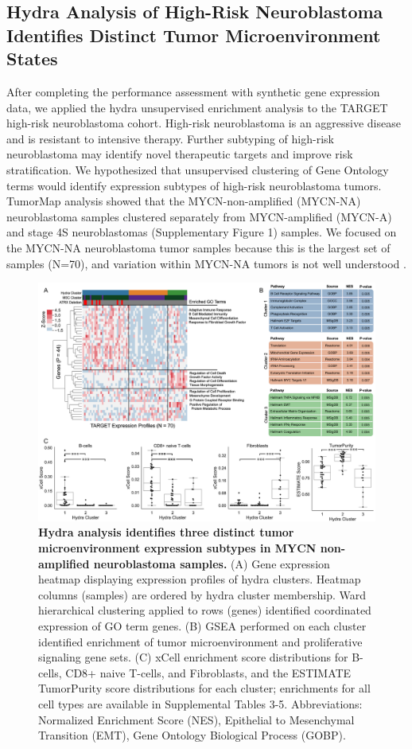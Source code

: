 \documentclass[10pt,letterpaper]{article}
\begin{document}
\subsection{Hydra Analysis of High-Risk Neuroblastoma Identifies Distinct Tumor Microenvironment States}
After completing the performance assessment with synthetic gene expression data, we applied the hydra unsupervised enrichment analysis to the TARGET high-risk neuroblastoma cohort. High-risk neuroblastoma is an aggressive disease and is resistant to intensive therapy. Further subtyping of high-risk neuroblastoma may identify novel therapeutic targets and improve risk stratification. We hypothesized that unsupervised clustering of Gene Ontology terms would identify expression subtypes of high-risk neuroblastoma tumors. TumorMap analysis showed that the MYCN-non-amplified (MYCN-NA) neuroblastoma samples clustered separately from MYCN-amplified (MYCN-A) and stage 4S neuroblastomas (Supplementary Figure 1) samples. We focused on the MYCN-NA neuroblastoma tumor samples because this is the largest set of samples (N=70), and variation within MYCN-NA tumors is not well understood \cite{morgensternChallengeDefiningUltrahighrisk2019a}.

\begin{figure}[!h]
	\includegraphics[width=\textwidth]{img/MYCN-NA-Figure-V5@2x}
	\caption{{\bf Hydra analysis identifies three distinct tumor microenvironment expression subtypes in MYCN non-amplified neuroblastoma samples.}
		(A) Gene expression heatmap displaying expression profiles of hydra clusters. Heatmap columns (samples) are ordered by hydra cluster membership. Ward hierarchical clustering applied to rows (genes) identified coordinated expression of GO term genes. (B) GSEA performed on each cluster identified enrichment of tumor microenvironment and proliferative signaling gene sets. (C) xCell enrichment score distributions for B-cells, CD8+ naive T-cells, and Fibroblasts, and the ESTIMATE TumorPurity score distributions for each cluster; enrichments for all cell types are available in Supplemental Tables 3-5. Abbreviations: Normalized Enrichment Score (NES), Epithelial to Mesenchymal Transition (EMT), Gene Ontology Biological Process (GOBP).
		\label{MYCN-NA}}
\end{figure}
\end{document}
